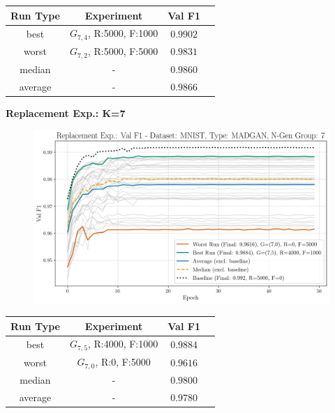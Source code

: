 \begin{table}[H]
	\vspace{-1em}
	\centering
	\begin{tabular}{|c|c|c|c|}
		\hline
		Run Type & Experiment & Val F1 \\ \hline
		best & \(G_{7, 4}\), R:5000, F:1000 & $0.9902$\\ \hline
		worst & \(G_{7, 2}\), R:5000, F:5000 & $0.9831$\\ \hline
		median & - & $0.9860$\\ \hline
		average & - & $0.9866$
		\\ \hline
	\end{tabular}
\end{table}
\noindent\textbf{Replacement Exp.: K=7}
\begin{figure}[htbp]
	\centering
	\includegraphics[width=.85\textwidth]{abb/strat_classifier_performance/MNIST_STRATIFIED_CLASSIFIERS_MADGAN_NEW/replacement_experiments/val_f1_score_MADGAN_MNIST_n_gen_7_all.png}
	\label{fig:app_strat_class_performance_replacement_exp._val_f1_score_7}
\end{figure}
\begin{table}[H]
	\vspace{-1em}
	\centering
	\begin{tabular}{|c|c|c|c|}
		\hline
		Run Type & Experiment & Val F1 \\ \hline
		best & \(G_{7, 5}\), R:4000, F:1000 & $0.9884$\\ \hline
		worst & \(G_{7, 0}\), R:0, F:5000 & $0.9616$\\ \hline
		median & - & $0.9800$\\ \hline
		average & - & $0.9780$
		\\ \hline
	\end{tabular}
\end{table}
